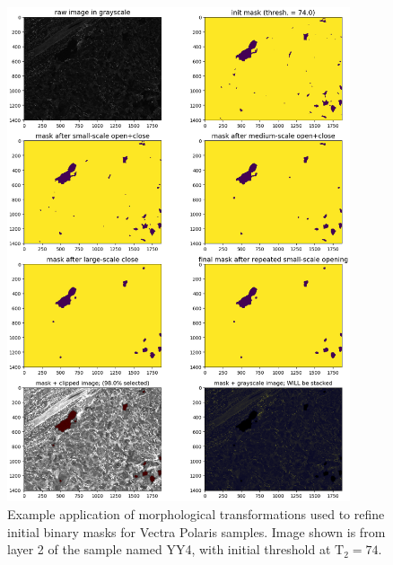 \documentclass[letterpaper,11pt]{article}
\newcommand{\Tau}{\mathrm{T}}
\begin{document}
\begin{figure}[!ht]
\centering
\includegraphics[width=0.9\textwidth]{images/masking/image_19990_layer_2_masks}
\caption{\footnotesize Example application of morphological transformations used to refine initial binary masks for Vectra Polaris samples. Image shown is from layer 2 of the sample named YY4, with initial threshold at $\Tau_{2}=74$.}
\label{fig:mask_example_polaris_med}
\end{figure}
\end{document}
